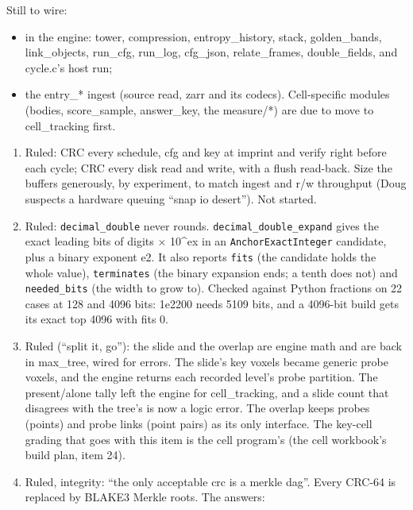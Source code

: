 Still to wire:

\begin{itemize}
\item in the engine: tower, compression, entropy\_\allowbreak{}history, stack, golden\_\allowbreak{}bands, link\_\allowbreak{}objects, run\_\allowbreak{}cfg, run\_\allowbreak{}log, cfg\_\allowbreak{}json, relate\_\allowbreak{}frames, double\_\allowbreak{}fields, and cycle.c's host run;
\item the entry\_\allowbreak{}* ingest (source read, zarr and its codecs). Cell-specific modules (bodies, score\_\allowbreak{}sample, answer\_\allowbreak{}key, the measure/*) are due to move to cell\_\allowbreak{}tracking first.
\end{itemize}

\begin{enumerate}
\item Ruled: CRC every schedule, cfg and key at imprint and verify right before each cycle; CRC every disk read and write, with a flush read-back. Size the buffers generously, by experiment, to match ingest and r/w throughput (Doug suspects a hardware queuing “snap io desert”). Not started.
\item Ruled: \texttt{decimal\_\allowbreak{}double} never rounds. \texttt{decimal\_\allowbreak{}double\_\allowbreak{}expand} gives the exact leading bits of digits × 10\textasciicircum{}ex in an \texttt{Anchor\allowbreak{}Exact\allowbreak{}Integer} candidate, plus a binary exponent e2. It also reports \texttt{fits} (the candidate holds the whole value), \texttt{terminates} (the binary expansion ends; a tenth does not) and \texttt{needed\_\allowbreak{}bits} (the width to grow to). Checked against Python fractions on 22 cases at 128 and 4096 bits: 1e2200 needs 5109 bits, and a 4096-bit build gets its exact top 4096 with fits 0.
\item Ruled (“split it, go”): the slide and the overlap are engine math and are back in max\_\allowbreak{}tree, wired for errors. The slide's key voxels became generic probe voxels, and the engine returns each recorded level's probe partition. The present/alone tally left the engine for cell\_\allowbreak{}tracking, and a slide count that disagrees with the tree's is now a logic error. The overlap keeps probes (points) and probe links (point pairs) as its only interface. The key-cell grading that goes with this item is the cell program's (the cell workbook's build plan, item 24).
\item Ruled, integrity: “the only acceptable crc is a merkle dag”. Every CRC-64 is replaced by BLAKE3 Merkle roots. The answers:
\end{enumerate}

